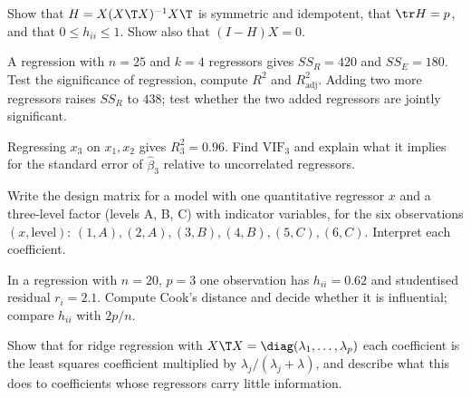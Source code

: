 \begin{exercise}
Show that $H=X(X\T X)^{-1}X\T$ is symmetric and idempotent, that $\tr H=p$, and that $0\le h_{ii}\le1$. Show also that $(I-H)X=0$.
\end{exercise}

\begin{exercise}
A regression with $n=25$ and $k=4$ regressors gives $SS_R=420$ and $SS_E=180$. Test the significance of regression, compute $R^2$ and $R^2_{\mathrm{adj}}$. Adding two more regressors raises $SS_R$ to $438$; test whether the two added regressors are jointly significant.
\end{exercise}

\begin{exercise}
Regressing $x_3$ on $x_1,x_2$ gives $R_3^2=0.96$. Find $\mathrm{VIF}_3$ and explain what it implies for the standard error of $\hat\beta_3$ relative to uncorrelated regressors.
\end{exercise}

\begin{exercise}
Write the design matrix for a model with one quantitative regressor $x$ and a three-level factor (levels A, B, C) with indicator variables, for the six observations $(x,\text{level})$: $(1,A),(2,A),(3,B),(4,B),(5,C),(6,C)$. Interpret each coefficient.
\end{exercise}

\begin{exercise}
In a regression with $n=20$, $p=3$ one observation has $h_{ii}=0.62$ and studentised residual $r_i=2.1$. Compute Cook's distance and decide whether it is influential; compare $h_{ii}$ with $2p/n$.
\end{exercise}

\begin{exercise}
Show that for ridge regression with $X\T X=\diag(\lambda_1,\dots,\lambda_p)$ each coefficient is the least squares coefficient multiplied by $\lambda_j/(\lambda_j+\lambda)$, and describe what this does to coefficients whose regressors carry little information.
\end{exercise}
